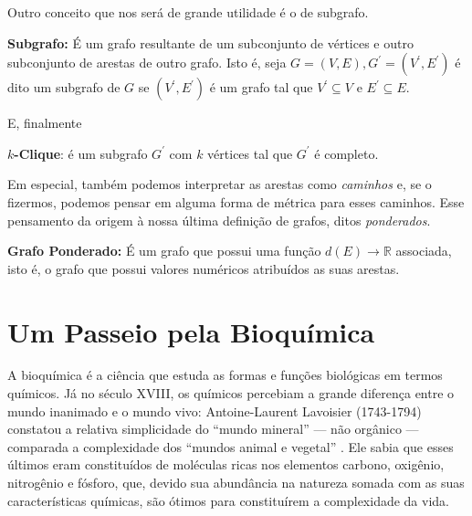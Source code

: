 \documentclass[a4paper,12pt]{article}
\begin{document}
	Outro conceito que nos será de grande utilidade é o de subgrafo.
	\begin{center}
		\begin{minipage}{0.9 \linewidth}
			\textbf{Subgrafo:} É um grafo resultante de um subconjunto de vértices e outro subconjunto de arestas de outro grafo. Isto é, seja $G = (V, E), G^\prime = (V^\prime, E^\prime)$ é dito um subgrafo de $G$ se $(V^\prime, E^\prime)$ é um grafo tal que $V^\prime \subseteq V$ e $E^\prime \subseteq E$.
		\end{minipage}
	\end{center}
	
	E, finalmente
	\begin{center}
		\begin{minipage}{0.9 \linewidth}
			\textbf{$k$-Clique}: é um subgrafo $G^\prime$ com $k$ vértices tal que $G^\prime$ é completo.
		\end{minipage}
	\end{center}
	
	Em especial, também podemos interpretar as arestas como \textit{caminhos} e, se o fizermos, podemos pensar em alguma forma de métrica para esses caminhos. Esse pensamento da origem à nossa última definição de grafos, ditos \textit{ponderados}.
	
	\begin{center}
		\begin{minipage}{0.9 \linewidth}
			\textbf{Grafo Ponderado:} É um grafo que possui uma função $d(E) \rightarrow \mathbb{R}$ associada, isto é, o grafo que possui valores numéricos atribuídos as suas arestas.
		\end{minipage}
	\end{center}		
	
	\newpage
	
	\section{Um Passeio pela Bioquímica \label{sec:biomol}}
	A bioquímica é a ciência que estuda as formas e funções biológicas em termos químicos. Já no século XVIII, os químicos percebiam a grande diferença entre o mundo inanimado e o mundo vivo: Antoine-Laurent Lavoisier (1743-1794) constatou a relativa simplicidade do ``mundo mineral'' --- não orgânico --- comparada a complexidade dos ``mundos animal e vegetal'' \cite{bioquimicaLehninger}. Ele sabia que esses últimos eram constituídos de moléculas ricas nos elementos carbono, oxigênio, nitrogênio e fósforo, que, devido sua abundância na natureza somada com as suas características químicas, são ótimos para constituírem a complexidade da vida.
\end{document}
